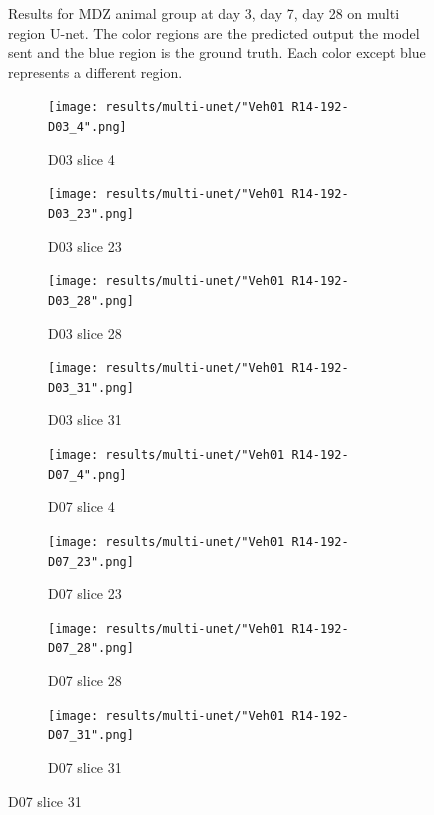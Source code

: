 \begin{figure}[!htb]
  \caption{Results for MDZ animal group at day 3, day 7, day 28 on multi region U-net. The color regions are the predicted output the model sent and the blue region is the ground truth. Each color except blue represents a different region.}
  \label{fig:results_multi_unet_MDZ}
\end{figure}



\begin{figure}[!htb]  
    \centering %
\begin{subfigure}{0.25\textwidth}
  \texttt{[image: results/multi-unet/"Veh01 R14-192-D03\_4".png]}
  \caption{D03 slice 4}
\end{subfigure}\hfil %
\begin{subfigure}{0.25\textwidth}
  \texttt{[image: results/multi-unet/"Veh01 R14-192-D03\_23".png]}
  \caption{D03 slice 23}
\end{subfigure}\hfil %
\begin{subfigure}{0.25\textwidth}
  \texttt{[image: results/multi-unet/"Veh01 R14-192-D03\_28".png]}
  \caption{D03 slice 28}
\end{subfigure}\hfil %
\begin{subfigure}{0.25\textwidth}
  \texttt{[image: results/multi-unet/"Veh01 R14-192-D03\_31".png]}
  \caption{D03 slice 31}
\end{subfigure}

\medskip
\begin{subfigure}{0.25\textwidth}
  \texttt{[image: results/multi-unet/"Veh01 R14-192-D07\_4".png]}
  \caption{D07 slice 4}
\end{subfigure}\hfil %
\begin{subfigure}{0.25\textwidth}
  \texttt{[image: results/multi-unet/"Veh01 R14-192-D07\_23".png]}
  \caption{D07 slice 23}
\end{subfigure}\hfil %
\begin{subfigure}{0.25\textwidth}
  \texttt{[image: results/multi-unet/"Veh01 R14-192-D07\_28".png]}
  \caption{D07 slice 28}
\end{subfigure}\hfil %
\begin{subfigure}{0.25\textwidth}
  \texttt{[image: results/multi-unet/"Veh01 R14-192-D07\_31".png]}
  \caption{D07 slice 31}
\end{subfigure}


\end{figure}
